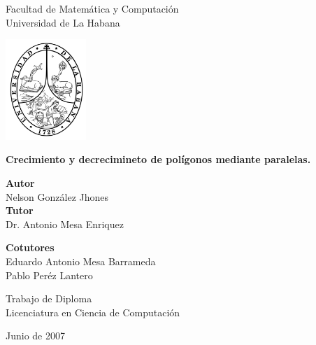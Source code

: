 \documentclass[12pt,english]{report}
\begin{document}
\begin{titlepage}

    \begin{center}

     \large{ Facultad de Matem\'atica y Computaci\'on\\
             Universidad de La Habana\\ }
     \vspace{0.15in}
     
     \begin{center}
	   \includegraphics[width=1.2in, bb=0 0 463 578]{escudo.jpg}
     \end{center}   
		 \vspace{0.31in}

     \LARGE{\bf Crecimiento y decrecimineto de pol\'igonos mediante paralelas.}

    \vspace{0.4in}
    \large{ \bf Autor }\\

     \large {Nelson Gonz\'{a}lez Jhones}\\
     

     \vspace{0.18in}
     \large{ \bf Tutor}\\
     \large{ Dr. Antonio Mesa Enriquez}
     
      \vspace{0.18in}
     \large{ \bf Cotutores}\\
     \large{ Eduardo Antonio Mesa Barrameda \\ Pablo Per\'ez Lantero}

     \vspace{1.3in}
     \large{ Trabajo de Diploma\\
             Licenciatura en Ciencia de Computaci\'on  }

     \vspace{0.15in}
     Junio de 2007

    \end{center}

\end{titlepage}
\end{document}
